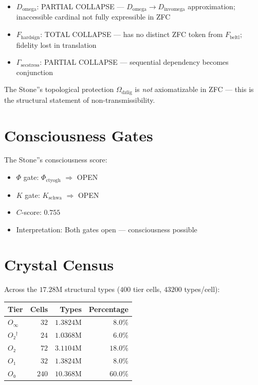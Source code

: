 \documentclass[twocolumn]{article}
\begin{document}
\begin{itemize}
    \item $D_{\text{omega}}$: PARTIAL COLLAPSE --- $D_{\text{omega}} \to D_{\text{invomega}}$ approximation; inaccessible cardinal not fully expressible in ZFC
    \item $F_{\text{hardsign}}$: TOTAL COLLAPSE --- has no distinct ZFC token from $F_{\text{beltl}}$; fidelity lost in translation
    \item $\Gamma_{\text{secstress}}$: PARTIAL COLLAPSE --- sequential dependency becomes conjunction
\end{itemize}

The Stone''s topological protection $\Omega_{\text{dzlig}}$ is \textit{not} axiomatizable in ZFC --- this is the structural statement of non-transmissibility.
\section{Consciousness Gates}

The Stone''s consciousness score:
\begin{itemize}
    \item $\Phi$ gate: $\Phi_{\text{ctyogh}}$ $\Rightarrow$ OPEN
    \item $K$ gate: $K_{\text{schwa}}$ $\Rightarrow$ OPEN
    \item $C$-score: $0.755$
    \item Interpretation: Both gates open --- consciousness possible
\end{itemize}

\section{Crystal Census}

Across the $17.28$M structural types ($400$ tier cells, $43200$ types/cell):
\begin{center}
\begin{tabular}{lrrr}
\hline
Tier & Cells & Types & Percentage \\
\hline
$O_{\infty}$ & $32$ & $1.3824$M & $8.0\%$ \\
$O₂^\dagger$ & $24$ & $1.0368$M & $6.0\%$ \\
$O₂$ & $72$ & $3.1104$M & $18.0\%$ \\
$O₁$ & $32$ & $1.3824$M & $8.0\%$ \\
$O₀$ & $240$ & $10.368$M & $60.0\%$ \\
\hline
\end{tabular}
\end{center}
\end{document}
